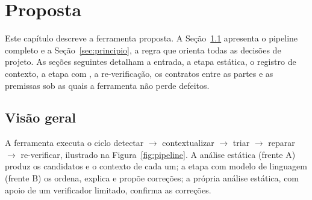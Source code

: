 \chapter{Proposta}
\label{cap:proposta}


Este capítulo descreve a ferramenta proposta. A Seção~\ref{sec:visao-geral}
apresenta o pipeline completo e a Seção~\ref{sec:principio}, a regra que
orienta todas as decisões de projeto. As seções seguintes detalham a entrada, a
etapa estática, o registro de contexto, a etapa com \llm, a re-verificação, os
contratos entre as partes e as premissas sob as quais a ferramenta não perde
defeitos.

\section{Visão geral}
\label{sec:visao-geral}

A ferramenta executa o ciclo detectar $\rightarrow$ contextualizar
$\rightarrow$ triar $\rightarrow$ reparar $\rightarrow$ re-verificar,
ilustrado na Figura~\ref{fig:pipeline}. A análise estática (frente A) produz os
candidatos e o contexto de cada um; a etapa com modelo de linguagem (frente B)
os ordena, explica e propõe correções; a própria análise estática, com apoio de
um verificador limitado, confirma as correções.

